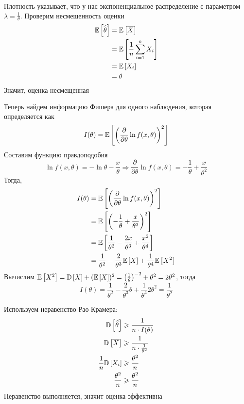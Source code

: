 \documentclass{article}
\begin{document}
Плотность указывает, что у нас экспоненциальное распределение с параметром $\lambda=\frac{1}{\theta}$. Проверим несмещенность оценки
\begin{equation*}
    \begin{aligned}
        \matwait{\widehat{\theta}}&=\matwait{\overline{X}}\\
        &=\matwait{\frac{1}{n}\sum_{i=1}^nX_i}\\
        &=\matwait{X_i}\\
        &=\theta
    \end{aligned}
\end{equation*}
Значит, оценка несмещенная

Теперь найдем информацию Фишера для одного наблюдения, которая определяется как
\begin{equation*}
    I(\theta)=\mathbb{E}\left[\left(\frac{\partial}{\partial\theta}\ln f(x,\theta)\right)^2\right]
\end{equation*}
Составим функцию правдоподобия
\begin{equation*}
    \ln f(x,\theta)=-\ln\theta-\frac{x}{\theta}\Longrightarrow\frac{\partial}{\partial\theta}\ln f(x,\theta)=-\frac{1}{\theta}+\frac{x}{\theta^2}
\end{equation*}
Тогда,
\begin{equation*}
    \begin{aligned}
        I(\theta)&=\mathbb{E}\left[\left(\frac{\partial}{\partial\theta}\ln f(x,\theta)\right)^2\right]\\
        &=\mathbb{E}\left[\left(-\frac{1}{\theta}+\frac{x}{\theta^2}\right)^2\right]\\
        &=\mathbb{E}\left[\frac{1}{\theta^2}-\frac{2x}{\theta^3}+\frac{x^2}{\theta^4}\right]\\
        &=\frac{1}{\theta^2}-\frac{2}{\theta^3}\mathbb{E}\left[X\right]+\frac{1}{\theta^4}\mathbb{E}\left[X^2\right]
    \end{aligned}
\end{equation*}
Вычислим $\mathbb{E}\left[X^2\right]=\mathbb{D}\left[X\right]+(\mathbb{E}\left[X\right])^2=\left(\frac{1}{\theta}\right)^{-2}+\theta^2=2\theta^2$, тогда
\begin{equation*}
    I(\theta)=\frac{1}{\theta^2}-\frac{2}{\theta^3}\theta+\frac{1}{\theta^4}2\theta^2=\frac{1}{\theta^2}
\end{equation*}

Используем неравенство Рао-Крамера:
\begin{equation*}
    \begin{aligned}
        \mathbb{D}\left[\widehat{\theta}\right]&\geqslant\frac{1}{n\cdot I(\theta)}\\
        \mathbb{D}\left[\overline{X}\right]&\geqslant\frac{1}{n\cdot\frac{1}{\theta^2}}\\
        \frac{1}{n}\mathbb{D}\left[X_i\right]&\geqslant\frac{\theta^2}{n}\\
        \frac{\theta^2}{n}&\geqslant\frac{\theta^2}{n}
    \end{aligned}
\end{equation*}
Неравенство выполняется, значит оценка эффективна
\end{document}
